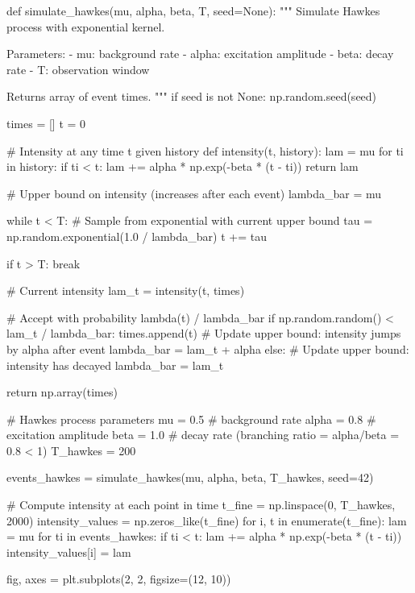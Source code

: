 \documentclass[a4paper, 11pt]{article}
\begin{document}
\begin{pycode}
def simulate_hawkes(mu, alpha, beta, T, seed=None):
    """
    Simulate Hawkes process with exponential kernel.

    Parameters:
    - mu: background rate
    - alpha: excitation amplitude
    - beta: decay rate
    - T: observation window

    Returns array of event times.
    """
    if seed is not None:
        np.random.seed(seed)

    times = []
    t = 0

    # Intensity at any time t given history
    def intensity(t, history):
        lam = mu
        for ti in history:
            if ti < t:
                lam += alpha * np.exp(-beta * (t - ti))
        return lam

    # Upper bound on intensity (increases after each event)
    lambda_bar = mu

    while t < T:
        # Sample from exponential with current upper bound
        tau = np.random.exponential(1.0 / lambda_bar)
        t += tau

        if t > T:
            break

        # Current intensity
        lam_t = intensity(t, times)

        # Accept with probability lambda(t) / lambda_bar
        if np.random.random() < lam_t / lambda_bar:
            times.append(t)
            # Update upper bound: intensity jumps by alpha after event
            lambda_bar = lam_t + alpha
        else:
            # Update upper bound: intensity has decayed
            lambda_bar = lam_t

    return np.array(times)

# Hawkes process parameters
mu = 0.5       # background rate
alpha = 0.8    # excitation amplitude
beta = 1.0     # decay rate (branching ratio = alpha/beta = 0.8 < 1)
T_hawkes = 200

events_hawkes = simulate_hawkes(mu, alpha, beta, T_hawkes, seed=42)

# Compute intensity at each point in time
t_fine = np.linspace(0, T_hawkes, 2000)
intensity_values = np.zeros_like(t_fine)
for i, t in enumerate(t_fine):
    lam = mu
    for ti in events_hawkes:
        if ti < t:
            lam += alpha * np.exp(-beta * (t - ti))
    intensity_values[i] = lam

fig, axes = plt.subplots(2, 2, figsize=(12, 10))


\end{pycode}
\end{document}
